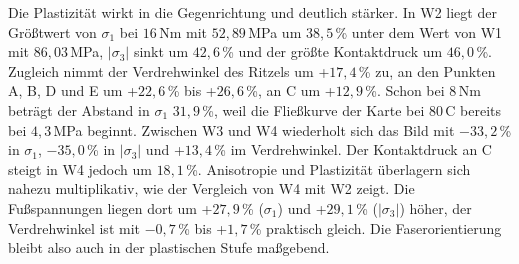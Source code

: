 
Die Plastizität wirkt in die Gegenrichtung und deutlich stärker. In W2 liegt der Größtwert von $\sigma_{\mathrm{1}}$ bei $16$\,Nm mit $52{,}89$\,MPa um $38{,}5$\,\% unter dem Wert von W1 mit $86{,}03$\,MPa, $|\sigma_{\mathrm{3}}|$ sinkt um $42{,}6$\,\% und der größte Kontaktdruck um $46{,}0$\,\%. Zugleich nimmt der Verdrehwinkel des Ritzels um +$17{,}4$\,\% zu, an den Punkten A, B, D und E um +$22{,}6$\,\% bis +$26{,}6$\,\%, an C um +$12{,}9$\,\%. Schon bei $8$\,Nm beträgt der Abstand in $\sigma_{\mathrm{1}}$ $31{,}9$\,\%, weil die Fließkurve der Karte bei $80$\,\textdegree C bereits bei $4{,}3$\,MPa beginnt. Zwischen W3 und W4 wiederholt sich das Bild mit $-$$33{,}2$\,\% in $\sigma_{\mathrm{1}}$, $-$$35{,}0$\,\% in $|\sigma_{\mathrm{3}}|$ und +$13{,}4$\,\% im Verdrehwinkel. Der Kontaktdruck an C steigt in W4 jedoch um $18{,}1$\,\%. Anisotropie und Plastizität überlagern sich nahezu multiplikativ, wie der Vergleich von W4 mit W2 zeigt. Die Fußspannungen liegen dort um +$27{,}9$\,\% ($\sigma_{\mathrm{1}}$) und +$29{,}1$\,\% ($|\sigma_{\mathrm{3}}|$) höher, der Verdrehwinkel ist mit $-$$0{,}7$\,\% bis +$1{,}7$\,\% praktisch gleich. Die Faserorientierung bleibt also auch in der plastischen Stufe maßgebend.


